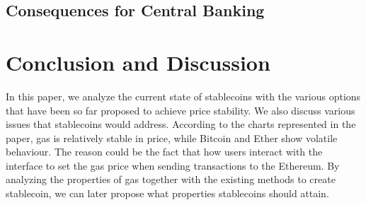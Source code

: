 



\subsection{Consequences for Central Banking}

\section{Conclusion and Discussion}
In this paper, we analyze the current state of stablecoins with the various options that have been so far proposed to achieve price stability. We also discuss various issues that stablecoins would address. According to the charts represented in the paper, gas is relatively stable in price, while Bitcoin and Ether show volatile behaviour. The reason could be the fact that how users interact with the interface to set the gas price when sending transactions to the Ethereum. By analyzing the properties of gas together with the existing methods to create stablecoin, we can later propose what properties stablecoins should attain.

